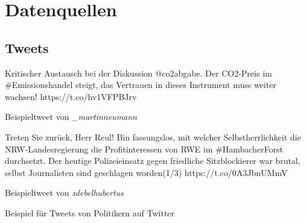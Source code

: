 
\addchap{\langanhang}


\pagebreak

\setcounter{section}{0}
\renewcommand{\thesection}{\Alph{section}}


\section{Datenquellen} \label{ch:dataAppendix}

\subsection*{Tweets}

\begin{example}[H]
    \begin{subexample}{0.45\textwidth}
        \small
        Kritischer Austausch bei der Diskussion @co2abgabe. Der CO2-Preis im \#Emissionshandel steigt, das Vertrauen in dieses Instrument muss weiter wachsen! https://t.co/hv1VFPBJrv
        \caption{Beispieltweet von \textit{\_martinneumann}}
    \end{subexample}\hfill
    \begin{subexample}{0.45\textwidth}
        \small
        Treten Sie zurück, Herr Reul! Bin fassungslos, mit welcher Selbstherrlichkeit die NRW-Landesregierung die Profitinteressen von RWE im \#HambacherForst durchsetzt. Der heutige Polizeieinsatz gegen friedliche Sitzblockierer war brutal, selbst Journalisten sind geschlagen worden(1/3) https://t.co/0A3JbnUMmV
        \caption{Beispieltweet von \textit{zdebelhubertus}}
    \end{subexample}\hfill
    \caption{Beispiel für Tweets von Politikern auf Twitter \autocite{saltzer_finding_2022}} \label{list:exampleTweets}
\end{example}

